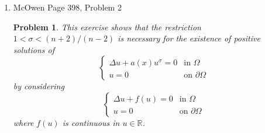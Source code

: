 \documentclass[a4paper]{article}
\newtheorem*{problem}{Problem}
\newcommand{\R}{\mathbb{R}}
\begin{document}
\begin{enumerate}
\begin{proof}
    By again using H\"{o}lder, we have
    \begin{equation*}
      \left| \int_{\Omega}^{} |u|^{\sigma-1} wv dx \right| \leq \left( \int_{\Omega}^{} |u|^{(\sigma-1)p} dx \right)^{\frac{1}{p}} \left(
      \int_{\Omega}^{} |w|^{p'} dx \right)^{\frac{1}{p'}} \left( \int_{\Omega}^{} |v|^{p'} dx \right)^{\frac{1}{p'}}
    \end{equation*}
    where $\frac{1}{p} + \frac{2}{p'} = 1$ By choosing $p=\frac{n}{2}$ and $p'=\frac{2n}{n-2}$, we can again use Sobolev Embedding to get
    \begin{equation*}
      \left| \int_{\Omega}^{} |u|^{\sigma-1} w v dx \right| \leq \|u\|_{H^1_0}^{\sigma-1} \|w\|_{H^1_0} \|v\|_{H^1_0}
    \end{equation*}

    Therefore,
    \begin{equation*}
      |(G'(u+w) - G'(u))v| \leq C(\|u\|_{H^1_0}^{\sigma-1} - 1) \|w\|_{H^1_0} \|v\|_{H^1_0}
    \end{equation*}

    By dividing by $\|v\|_{H^1_0}$ and using the fact that $u \in H^1_0(\Omega)$, we see
    \begin{align*}
      \frac{| (G'(u+w) - G'(u))v |}{\|v\|_{H^1_0}} &\leq C \|w\|_{H^1_0}
    \end{align*}

    Thus, $G'$ is continuous, and $G$ is $C^1$.

    \end{proof}

    \pagebreak

  \item McOwen Page 398, Problem 2
    \begin{problem}
      This exercise shows that the restriction $1 < \sigma < (n+2)/(n-2)$ is necessary for the existence of positive solutions of
      \[ \begin{cases}
          \Delta u + a(x) u^\sigma = 0 &\text{in } \Omega \\
          u = 0 &\text{on } \partial \Omega
        \end{cases} \]
        by considering
        \begin{equation}
          \begin{cases}
            \Delta u + f(u) = 0 &\text{in } \Omega \\
            u=0 &\text{on } \partial \Omega
          \end{cases}
          \label{eqn:prob2}
        \end{equation}
        where $f(u)$ is continuous in $u \in \R$.


\end{problem}
\end{enumerate}
\end{document}
